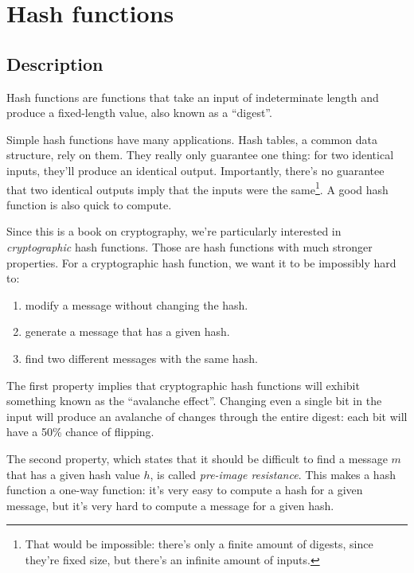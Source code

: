 \documentclass[11pt,ebook,table,dvipsnames]{memoir}
\begin{document}
\chapter{Hash functions}
\label{sec-2-6}
\section{Description}
\label{sec-2-6-1}

Hash functions are functions that take an input of indeterminate
length and produce a fixed-length value, also known as a \enquote{digest}.

Simple hash functions have many applications. Hash tables, a common
data structure, rely on them. They really only guarantee one thing: for
two identical inputs, they'll produce an identical output.
Importantly, there's no guarantee that two identical outputs imply
that the inputs were the same\footnote{That would be impossible: there's
only a finite amount of digests, since they're fixed size, but there's
an infinite amount of inputs.}. A good hash function is also quick to
compute.

Since this is a book on cryptography, we're particularly interested
in \emph{cryptographic} hash functions. Those are hash functions with much
stronger properties. For a cryptographic hash function, we want it to
be impossibly hard to:

\begin{enumerate}
\item modify a message without changing the hash.
\item generate a message that has a given hash.
\item find two different messages with the same hash.
\end{enumerate}

The first property implies that cryptographic hash functions will
exhibit something known as the \enquote{avalanche effect}. Changing even a
single bit in the input will produce an avalanche of changes through
the entire digest: each bit will have a 50\% chance
of flipping.

The second property, which states that it should be difficult to find
a message $m$ that has a given hash value $h$, is called \emph{pre-image
resistance}. This makes a hash function a one-way function: it's very
easy to compute a hash for a given message, but it's very hard to
compute a message for a given hash.
\end{document}
